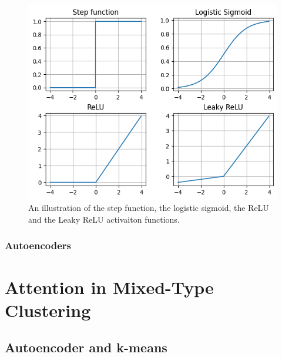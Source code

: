 \begin{figure}
	\includegraphics[width=\linewidth]{activation-functions.png}
	\caption{An illustration of the step function, the logistic sigmoid, the ReLU and the Leaky ReLU activaiton functions.}
	\label{activation_functions}
\end{figure}

\subsection{Autoencoders}

\chapter{Attention in Mixed-Type Clustering}

\section{Autoencoder and k-means}

